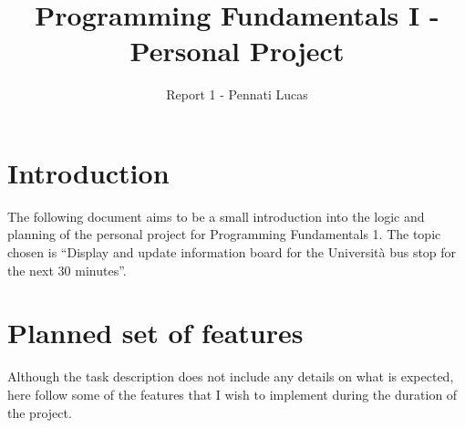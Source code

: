 \documentclass[a4paper]{article}
\title{Programming Fundamentals I - Personal Project}
\author{Report 1 - Pennati Lucas}
\begin{document}
\maketitle
\section{Introduction}
The following document aims to be a small introduction into the logic and planning of the personal project for Programming Fundamentals 1. The topic chosen is ``Display and update information board for the Universit\`a bus stop for the next 30 minutes''.
\section{Planned set of features}
Although the task description does not include any details on what is expected, here follow some of the features that I wish to implement during the duration of the project.
\end{document}
